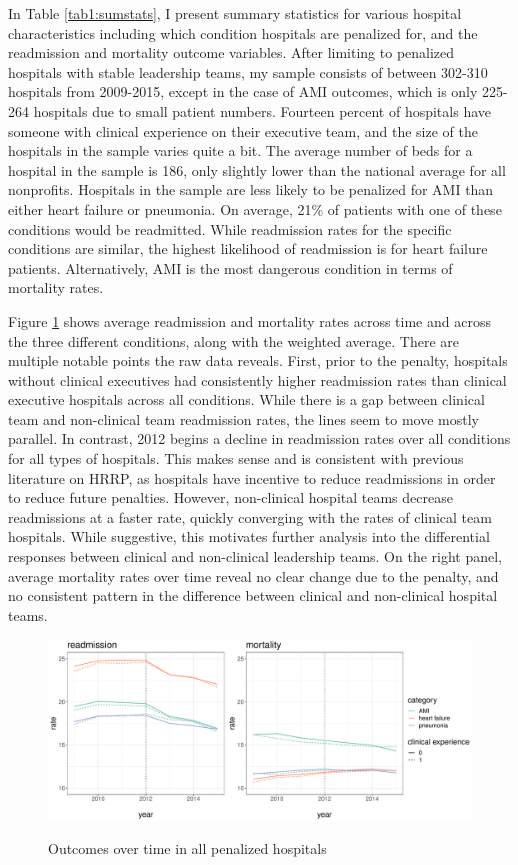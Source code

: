 \documentclass[12pt]{article}
\begin{document}
    In Table \ref{tab1:sumstats}, I present summary statistics for various hospital characteristics including which condition hospitals are penalized for, and the readmission and mortality outcome variables. After limiting to penalized hospitals with stable leadership teams, my sample consists of between 302-310 hospitals from 2009-2015, except in the case of AMI outcomes, which is only 225-264 hospitals due to small patient numbers. Fourteen percent of hospitals have someone with clinical experience on their executive team, and the size of the hospitals in the sample varies quite a bit. The average number of beds for a hospital in the sample is 186, only slightly lower than the national average for all nonprofits. Hospitals in the sample are less likely to be penalized for AMI than either heart failure or pneumonia. On average, 21\% of patients with one of these conditions would be readmitted. While readmission rates for the specific conditions are similar, the highest likelihood of readmission is for heart failure patients. Alternatively, AMI is the most dangerous condition in terms of mortality rates. 

    Figure \ref{fig:weighted_read_mort_graph} shows average readmission and mortality rates across time and across the three different conditions, along with the weighted average. There are multiple notable points the raw data reveals. First, prior to the penalty, hospitals without clinical executives had consistently higher readmission rates than clinical executive hospitals across all conditions. While there is a gap between clinical team and non-clinical team readmission rates, the lines seem to move mostly parallel. In contrast, 2012 begins a decline in readmission rates over all conditions for all types of hospitals. This makes sense and is consistent with previous literature on HRRP, as hospitals have incentive to reduce readmissions in order to reduce future penalties. However, non-clinical hospital teams decrease readmissions at a faster rate, quickly converging with the rates of clinical team hospitals. While suggestive, this motivates further analysis into the differential responses between clinical and non-clinical leadership teams. On the right panel, average mortality rates over time reveal no clear change due to the penalty, and no consistent pattern in the difference between clinical and non-clinical hospital teams. 

    \begin{figure}[ht!]
        \caption{Outcomes over time in all penalized hospitals}
        \includegraphics[scale=.5]{Objects/weighted_read_mort_graph.pdf}
        \label{fig:weighted_read_mort_graph}
    \end{figure}
\end{document}
